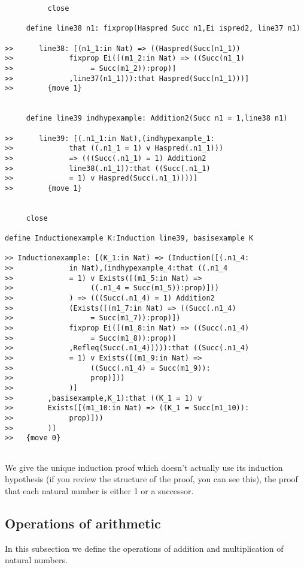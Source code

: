 \documentclass[12pt]{article}
\begin{document}
\begin{verbatim}
          close

     define line38 n1: fixprop(Haspred Succ n1,Ei ispred2, line37 n1)

>>      line38: [(n1_1:in Nat) => ((Haspred(Succ(n1_1)) 
>>             fixprop Ei([(m1_2:in Nat) => ((Succ(n1_1) 
>>                  = Succ(m1_2)):prop)]
>>             ,line37(n1_1))):that Haspred(Succ(n1_1)))]
>>        {move 1}


     define line39 indhypexample: Addition2(Succ n1 = 1,line38 n1)

>>      line39: [(.n1_1:in Nat),(indhypexample_1:
>>             that ((.n1_1 = 1) v Haspred(.n1_1))) 
>>             => (((Succ(.n1_1) = 1) Addition2 
>>             line38(.n1_1)):that ((Succ(.n1_1) 
>>             = 1) v Haspred(Succ(.n1_1))))]
>>        {move 1}


     close

define Inductionexample K:Induction line39, basisexample K

>> Inductionexample: [(K_1:in Nat) => (Induction([(.n1_4:
>>             in Nat),(indhypexample_4:that ((.n1_4 
>>             = 1) v Exists([(m1_5:in Nat) => 
>>                  ((.n1_4 = Succ(m1_5)):prop)]))
>>             ) => (((Succ(.n1_4) = 1) Addition2 
>>             (Exists([(m1_7:in Nat) => ((Succ(.n1_4) 
>>                  = Succ(m1_7)):prop)])
>>             fixprop Ei([(m1_8:in Nat) => ((Succ(.n1_4) 
>>                  = Succ(m1_8)):prop)]
>>             ,Refleq(Succ(.n1_4))))):that ((Succ(.n1_4) 
>>             = 1) v Exists([(m1_9:in Nat) => 
>>                  ((Succ(.n1_4) = Succ(m1_9)):
>>                  prop)]))
>>             )]
>>        ,basisexample,K_1):that ((K_1 = 1) v 
>>        Exists([(m1_10:in Nat) => ((K_1 = Succ(m1_10)):
>>             prop)]))
>>        )]
>>   {move 0}


\end{verbatim}

We give the unique induction proof which doesn't actually use its induction hypothesis (if you review the structure of the proof, you can see this),
the proof that each natural number is either 1 or a successor.

\subsection{Operations of arithmetic}

In this subsection we define the operations of addition and multiplication of natural numbers.
\end{document}
